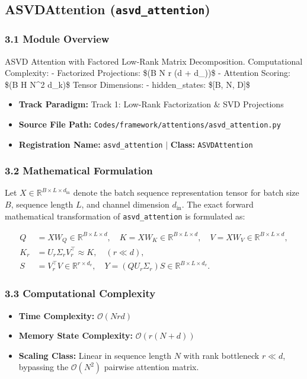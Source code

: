 \subsection{ASVDAttention (\texttt{asvd\_attention})}
\label{sec:app_module_asvd_attention}

\subsubsection*{3.1 Module Overview}
ASVD Attention with Factored Low-Rank Matrix Decomposition.  Computational Complexity:     - Factorized Projections: \$(B \cdot N \cdot r \cdot (d + d\_{}))\$     - Attention Scoring: \$(B \cdot H \cdot N^2 \cdot d\_k)\$  Tensor Dimensions:     - hidden\_states: \$[B, N, D]\$ 
\begin{itemize}
    \item \textbf{Track Paradigm:} Track 1: Low-Rank Factorization & SVD Projections
    \item \textbf{Source File Path:} \texttt{Codes/framework/attentions/asvd\_attention.py}
    \item \textbf{Registration Name:} \texttt{asvd\_attention} $\mid$ \textbf{Class:} \texttt{ASVDAttention}
\end{itemize}

\subsubsection*{3.2 Mathematical Formulation}
Let $X \in \mathbb{R}^{B \times L \times d_{\text{in}}}$ denote the batch sequence representation tensor for batch size $B$, sequence length $L$, and channel dimension $d_{\text{in}}$. The exact forward mathematical transformation of \texttt{asvd\_attention} is formulated as:

\begin{align}
Q &= X W_Q \in \mathbb{R}^{B \times L \times d}, \quad K = X W_K \in \mathbb{R}^{B \times L \times d}, \quad V = X W_V \in \mathbb{R}^{B \times L \times d}, \\
K_r &= U_r \Sigma_r V_r^\top \approx K, \quad (r \ll d), \\
S &= V_r^\top V \in \mathbb{R}^{r \times d_v}, \quad Y = (Q U_r \Sigma_r) S \in \mathbb{R}^{B \times L \times d_v}.
\end{align}


\subsubsection*{3.3 Computational Complexity}
\begin{itemize}
    \item \textbf{Time Complexity:} $\mathcal{O}(N r d)$
    \item \textbf{Memory State Complexity:} $\mathcal{O}(r(N + d))$
    \item \textbf{Scaling Class:} Linear in sequence length $N$ with rank bottleneck $r \ll d$, bypassing the $\mathcal{O}(N^2)$ pairwise attention matrix.
\end{itemize}

